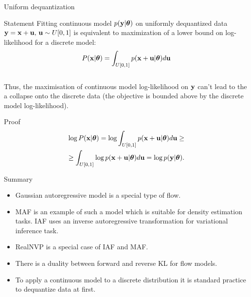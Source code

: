 \begin{frame}{Uniform dequantization}
	\begin{block}{Statement}
		Fitting continuous model $p(\mathbf{y} | \boldsymbol{\theta})$ on uniformly dequantized data $\mathbf{y} = \mathbf{x} + \mathbf{u}, \, \mathbf{u} \sim U[0, 1]$ is equivalent to maximization of a lower bound on log-likelihood for a discrete model:
		\[
		P(\mathbf{x} | \boldsymbol{\theta}) = \int_{U[0, 1]} p(\mathbf{x} + \mathbf{u} | \boldsymbol{\theta}) d \mathbf{u}
		\]
		\vspace{-0.2cm} \\
		Thus, the maximisation of continuous model log-likelihood on $\mathbf{y}$ can't lead to the a collapse onto the discrete data (the objective is bounded above by the discrete model log-likelihood).
	\end{block}
	\begin{block}{Proof}
		\vspace{-1cm}
		\begin{multline*}
			 \log P(\mathbf{x} | \boldsymbol{\theta}) = \log \int_{U[0, 1]} p(\mathbf{x} + \mathbf{u} | \boldsymbol{\theta}) d \mathbf{u} \geq \\ \geq \int_{U[0, 1]} \log p(\mathbf{x} + \mathbf{u} | \boldsymbol{\theta}) d \mathbf{u} = \log p(\mathbf{y} | \boldsymbol{\theta}).
		\end{multline*}
	\end{block}
\end{frame}
\begin{frame}{Summary}
	\begin{itemize}
		\item Gaussian autoregressive model is a special type of flow.
		\vfill
		\item MAF is an example of such a model which is suitable for density estimation tasks. IAF uses an inverse autoregressive transformation for variational inference task.
		\vfill
		\item RealNVP is a special case of IAF and MAF.
		\vfill
		\item There is a duality between forward and reverse KL for flow models.
		\vfill
		\item To apply a continuous model to a discrete distribution it is standard practice to dequantize data at first.
	\end{itemize}
\end{frame}
 